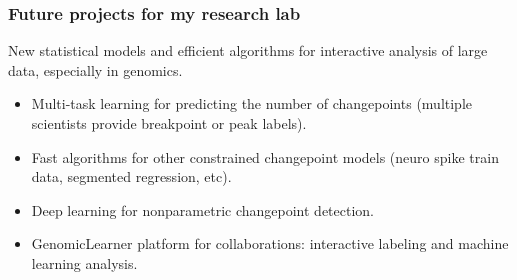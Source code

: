\documentclass{beamer}
\begin{document}
\begin{frame}
  \frametitle{Future projects for my research lab}
  New statistical models and efficient algorithms for interactive
  analysis of large data, especially in genomics.
  \begin{itemize}
  \item Multi-task learning for predicting the number of changepoints
    (multiple scientists provide breakpoint or peak labels).
  \item Fast algorithms for other constrained changepoint models
    (neuro spike train data, segmented regression, etc).
  \item Deep learning for nonparametric changepoint detection.
  \item GenomicLearner platform for collaborations: interactive
    labeling and machine learning analysis.
  \end{itemize}
\end{frame}


\end{document}
